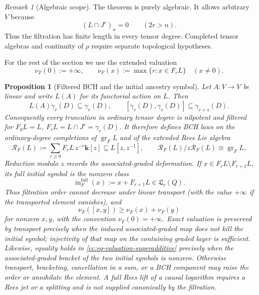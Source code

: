 \documentclass[10pt,reqno]{amsart}
\theoremstyle{plain}
\newtheorem{proposition}[theorem]{Proposition}
\theoremstyle{definition}
\theoremstyle{remark}
\newtheorem{remark}[theorem]{Remark}
\begin{document}
\begin{remark}[Algebraic scope]
\label{cc:rem-algebraic-scope}
The theorem is purely algebraic.  It allows arbitrary \(V\) because
\[
 (L\cap J^r)_n=0\qquad(2r>n).
\]
Thus the filtration has finite length in every tensor degree.  Completed
tensor algebras and continuity of \(\rho\) require separate topological
hypotheses.
\end{remark}

For the rest of the section we use the extended valuation
\begin{equation}
 \nu_F(0):=+\infty,
 \qquad
 \nu_F(x):=\max\{r:x\in F_rL\}\quad(x\ne0).
 \label{cc:eq-extended-F-valuation}
\end{equation}

\begin{proposition}[Filtered BCH and the initial ancestry symbol]
\label{cc:prop-filtered-bch}
\label{cc:cor-causal-special-fibre}
\label{cc:cor-bch-cobracket}
Let \(A:V\to V\) be linear and write \(L(A)\) for its functorial action
on \(L\).  Then
\[
 L(A)\gamma_r(D)\subseteq\gamma_r(D),
 \qquad
 [\gamma_r(D),\gamma_s(D)]\subseteq\gamma_{r+s}(D).
\]
Consequently every truncation in ordinary tensor degree is nilpotent and
filtered for
\(F_0L=L\), \(F_rL=L\cap J^r=\gamma_r(D)\).  It therefore defines BCH
laws on the ordinary-degree completions of \({\operatorname{gr}}_FL\) and of the extended
Rees Lie algebra
\begin{equation}
 \mathcal R_F(L):=
 \sum_{r\geq0}F_rL\,z^{-r}\mathbf k[z]
 \subseteq L[z,z^{-1}],
 \qquad
 \mathcal R_F(L)/z\mathcal R_F(L)\cong{\operatorname{gr}}_FL,
 \label{cc:eq-rees-lie}
\end{equation}
Reduction modulo \(z\) records the associated-graded deformation.  If
\(x\in F_rL\setminus F_{r+1}L\),
its full initial symbol is the nonzero class
\begin{equation}
 \operatorname{in}^{\mathrm{full}}_F(x)
 :=x+F_{r+1}L\in{\mathfrak L}_r(Q).
 \label{cc:eq-initial-symbol}
\end{equation}
Thus filtration order cannot decrease under linear transport (with the
value \(+\infty\) if the transported element vanishes), and
\begin{equation}
 \nu_F([x,y])\geq\nu_F(x)+\nu_F(y)
 \label{cc:eq-valuation-superadditive}
\end{equation}
for nonzero \(x,y\), with the convention \(\nu_F(0)=+\infty\).  Exact
valuation is preserved
by transport precisely when the induced associated-graded map does not kill
the initial symbol; injectivity of that map on the containing graded layer
is sufficient.  Likewise,
equality holds in \eqref{cc:eq-valuation-superadditive} precisely when
the associated-graded bracket of the two initial symbols is nonzero.
Otherwise transport,
bracketing, cancellation in a sum, or a BCH component may raise the order
or annihilate the element.  A full Rees lift of a causal logarithm requires
a Rees jet or a splitting and is not supplied canonically by the filtration.


\end{proposition}
\end{document}
